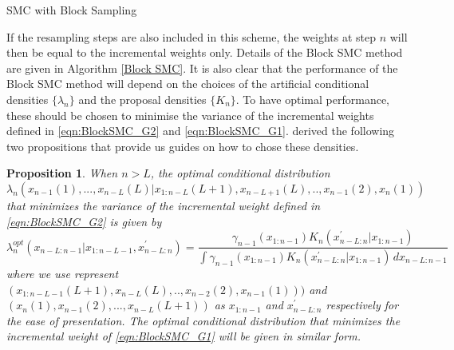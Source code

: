 \documentclass[12pt,a4paper]{article}
\newtheorem{proposition}{Proposition}
\begin{document}
\begin{algorithm}[htb!]
    \caption{SMC with Block Sampling} \label{Block SMC}
\end{algorithm}
If the resampling steps are also included in this scheme, the weights at step $n$ will then be equal to the incremental weights only. Details of the Block SMC method are given in Algorithm \ref{Block SMC}. It is also clear that the performance of the Block SMC method will depend on the choices of the artificial conditional densities \(\{\lambda_n\}\) and the proposal densities \(\{K_n\}\). To have optimal performance, these should be chosen to minimise the variance of the incremental weights defined in \eqref{eqn:BlockSMC_G2} and \eqref{eqn:BlockSMC_G1}. \cite{doucet2006efficient} derived the following two propositions that provide us guides on how to chose these densities. 
\begin{proposition}\label{optimal lambda}
    When \(n>L\), the optimal conditional distribution \[\lambda_n(x_{n-1}(1),...,x_{n-L}(L)|x_{1:n-L}(L+1),x_{n-L+1}(L),..,x_{n-1}(2),x_n(1))\] that minimizes the variance of the incremental weight defined in \eqref{eqn:BlockSMC_G2} is given by
    \begin{equation}
        \label{eqn:BlockSMC_optimallambda}
        \lambda_n^{opt}(x_{n-L:n-1}|x_{1:n-L-1},x_{n-L:n}^{'}) = \frac{\gamma_{n-1}(x_{1:n-1})K_n(x_{n-L:n}^{'}|x_{1:n-1})}{\int \gamma_{n-1}(x_{1:n-1})K_n(x_{n-L:n}^{'}|x_{1:n-1})\,dx_{n-L:n-1}}
    \end{equation}
    where we use represent \((x_{1:n-L-1}(L+1),x_{n-L}(L),..,x_{n-2}(2),x_{n-1}(1)))\) and \((x_{n}(1),x_{n-1}(2),...,x_{n-L}(L+1))\) as \(x_{1:n-1}\) and \(x_{n-L:n}^{'}\) respectively for the ease of presentation. The optimal conditional distribution that minimizes the incremental weight of \eqref{eqn:BlockSMC_G1} will be given in similar form. 
\end{proposition}
\end{document}
